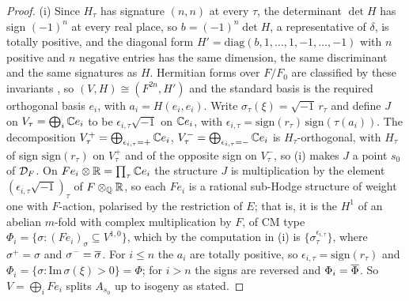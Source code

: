 \begin{proof}
(i) Since $H_{\tau}$ has signature $(n,n)$ at every $\tau$, the determinant
$\det H$ has sign $(-1)^{n}$ at every real place, so $b=(-1)^{n}\det H$, a
representative of $\delta$, is totally positive, and the diagonal form $H'=\mathrm{diag}(b,1,\dots,1,-1,\dots,-1)$
with $n$ positive and $n$ negative entries has the same dimension, the same
discriminant and the same signatures as $H$. Hermitian forms over $F/F_{0}$
are classified by these invariants \cite[Ch.~10, \S6]{Sch85}, so
$(V,H)\cong(F^{2n},H')$ and the standard basis is the required orthogonal
basis $e_{i}$, with $a_{i}=H(e_{i},e_{i})$. Write $\sigma_{\tau}(\xi)=\sqrt{-1}\,r_{\tau}$
and define $J$ on $V_{\tau}=\bigoplus_{i}\mathbb{C} e_{i}$ to be
$\epsilon_{i,\tau}\sqrt{-1}$ on $\mathbb{C} e_{i}$, with
$\epsilon_{i,\tau}=\mathrm{sign}(r_{\tau})\,\mathrm{sign}(\tau(a_{i}))$. The
decomposition $V_{\tau}^{+}=\bigoplus_{\epsilon_{i,\tau}=+}\mathbb{C} e_{i}$,
$V_{\tau}^{-}=\bigoplus_{\epsilon_{i,\tau}=-}\mathbb{C} e_{i}$ is $H_{\tau}$-orthogonal,
with $H_{\tau}$ of sign $\mathrm{sign}(r_{\tau})$ on $V_{\tau}^{+}$ and of the
opposite sign on $V_{\tau}^{-}$, so (i) makes $J$ a point
$s_{0}$ of $\mathcal{D}_{F}$. On $Fe_{i}\otimes\mathbb{R}=\prod_{\tau}\mathbb{C} e_{i}$ the
structure $J$ is multiplication by the element
$(\epsilon_{i,\tau}\sqrt{-1})_{\tau}$ of $F\otimes_{\mathbb{Q}}\mathbb{R}$, so each $Fe_{i}$
is a rational sub-Hodge structure of weight one with $F$-action, polarised by
the restriction of $E$; that is, it is the $H^{1}$ of an abelian $m$-fold with
complex multiplication by $F$, of CM type
$\Phi_{i}=\{\sigma:(Fe_{i})_{\sigma}\subseteq V^{1,0}\}$, which by the
computation in (i) is
$\{\sigma_{\tau}^{\epsilon_{i,\tau}}\}$, where $\sigma^{+}=\sigma$ and
$\sigma^{-}=\overline{\sigma}$. For $i\le n$ the $a_{i}$ are totally positive, so
$\epsilon_{i,\tau}=\mathrm{sign}(r_{\tau})$ and
$\Phi_{i}=\{\sigma:\mathrm{Im}\,\sigma(\xi)>0\}=\Phi$; for $i>n$ the signs are
reversed and $\Phi_{i}=\overline{\Phi}$. So $V=\bigoplus_{i}Fe_{i}$ splits
$A_{s_{0}}$ up to isogeny as stated.


\end{proof}
